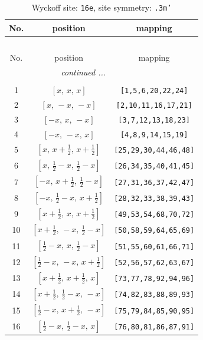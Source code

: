 \documentclass[fleqn,8pt]{jsarticle}
\begin{document}
\begin{longtable}{ccc}
\caption{Wyckoff site: {\tt 16e}, site symmetry: {\tt .3m'}}
 \\
 \hline \hline
No. & position & mapping \\ \hline \endfirsthead

\multicolumn{2}{l}{\tablename\ \thetable{}} \\
 \hline \hline
No. & position & mapping \\ \hline \endhead

 \hline \hline
\multicolumn{2}{r}{\footnotesize\it continued ...} \\ \endfoot

 \hline \hline
\multicolumn{2}{r}{} \\ \endlastfoot

1 & $\left[ x,\, x,\, x \right]$ & {\tt [1,5,6,20,22,24]} \\ \hline
2 & $\left[ x,\, - x,\, - x \right]$ & {\tt [2,10,11,16,17,21]} \\ \hline
3 & $\left[ - x,\, x,\, - x \right]$ & {\tt [3,7,12,13,18,23]} \\ \hline
4 & $\left[ - x,\, - x,\, x \right]$ & {\tt [4,8,9,14,15,19]} \\ \hline
5 & $\left[ x,\, x + \frac{1}{2},\, x + \frac{1}{2} \right]$ & {\tt [25,29,30,44,46,48]} \\ \hline
6 & $\left[ x,\, \frac{1}{2} - x,\, \frac{1}{2} - x \right]$ & {\tt [26,34,35,40,41,45]} \\ \hline
7 & $\left[ - x,\, x + \frac{1}{2},\, \frac{1}{2} - x \right]$ & {\tt [27,31,36,37,42,47]} \\ \hline
8 & $\left[ - x,\, \frac{1}{2} - x,\, x + \frac{1}{2} \right]$ & {\tt [28,32,33,38,39,43]} \\ \hline
9 & $\left[ x + \frac{1}{2},\, x,\, x + \frac{1}{2} \right]$ & {\tt [49,53,54,68,70,72]} \\ \hline
10 & $\left[ x + \frac{1}{2},\, - x,\, \frac{1}{2} - x \right]$ & {\tt [50,58,59,64,65,69]} \\ \hline
11 & $\left[ \frac{1}{2} - x,\, x,\, \frac{1}{2} - x \right]$ & {\tt [51,55,60,61,66,71]} \\ \hline
12 & $\left[ \frac{1}{2} - x,\, - x,\, x + \frac{1}{2} \right]$ & {\tt [52,56,57,62,63,67]} \\ \hline
13 & $\left[ x + \frac{1}{2},\, x + \frac{1}{2},\, x \right]$ & {\tt [73,77,78,92,94,96]} \\ \hline
14 & $\left[ x + \frac{1}{2},\, \frac{1}{2} - x,\, - x \right]$ & {\tt [74,82,83,88,89,93]} \\ \hline
15 & $\left[ \frac{1}{2} - x,\, x + \frac{1}{2},\, - x \right]$ & {\tt [75,79,84,85,90,95]} \\ \hline
16 & $\left[ \frac{1}{2} - x,\, \frac{1}{2} - x,\, x \right]$ & {\tt [76,80,81,86,87,91]} \\
\end{longtable}
\end{document}
